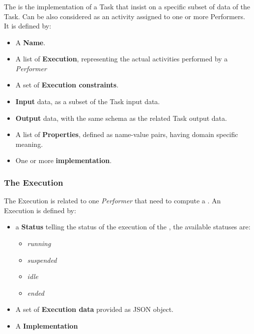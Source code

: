 \subsubsection{\utask{}}
The \utask{} is the implementation of a Task that insist on a specific subset
of data of the Task. Can be also considered as an activity assigned to one or
more Performers. It is defined by:
\begin{itemize}
    \item A \textbf{Name}.
    
    \item A list of \textbf{Execution}, representing the actual activities
    performed by a \emph{Performer}
    
    \item A set of \textbf{Execution constraints}.
    
    \item \textbf{Input} data, as a subset of the Task input data.
    
    \item \textbf{Output} data, with the same schema as the related Task output
    data.
    
    \item A list of \textbf{Properties}, defined as name-value pairs, having
    domain specific meaning. 
    
    \item One or more \textbf{\utask{} implementation}.
\end{itemize}







\subsubsection{The Execution}
The Execution is related to one \emph{Performer} that need to compute a \utask{}.
An Execution is defined by:
\begin{itemize}
    \item a \textbf{Status} telling the status of the execution of the \utask{},
    the available statuses are:
    \begin{itemize}
        \item \emph{running}
        \item \emph{suspended}
        \item \emph{idle}
        \item \emph{ended}
    \end{itemize}

    \item A set of \textbf{Execution data} provided as \ac{JSON} object.

    \item A \utask{} \textbf{Implementation}
\end{itemize}







